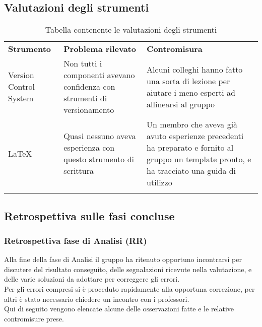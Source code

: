 \documentclass[../piano_di_qualifica.tex]{subfiles}
\begin{document}
\subsection{Valutazioni degli strumenti}
\label{sub:valut_strumenti}

\begin{center}
	\begin{longtable}{|p{3cm}|p{4.5cm}|p{4.5cm}|}
		\hline
		\rowcolor{lightgray}
		\textbf{Strumento}                                                       & \textbf{Problema rilevato} & \textbf{Contromisura}                 \\
		Version Control System                                                   &
		Non tutti i componenti avevano confidenza con strumenti di versionamento &
		Alcuni colleghi hanno fatto una sorta di lezione per aiutare i meno esperti ad allinearsi al gruppo                                           \\
		\LaTeX                                                                   &
		Quasi nessuno aveva esperienza con questo strumento di scrittura         &
		Un membro che aveva già avuto esperienze precedenti ha preparato e fornito al gruppo un template pronto, e ha tracciato una guida di utilizzo \\
		\hline
		\rowcolor{white}
		\caption{Tabella contenente le valutazioni degli strumenti}
	\end{longtable}
\end{center}

\subsection{Retrospettiva sulle fasi concluse}
\label{sub:retrospettiva}

\subsubsection{Retrospettiva fase di Analisi (RR)}
\label{par:retrospettiva-RR}
Alla fine della fase di Analisi il gruppo ha ritenuto opportuno incontrarsi per discutere del risultato conseguito, delle segnalazioni
ricevute nella valutazione, e delle varie soluzioni da adottare per correggere gli errori.\\
Per gli errori compresi si è proceduto rapidamente alla opportuna correzione, per altri è stato necessario chiedere un incontro
con i professori. \\
Qui di seguito vengono elencate alcune delle osservazioni fatte e le relative contromisure prese.\\
\end{document}
